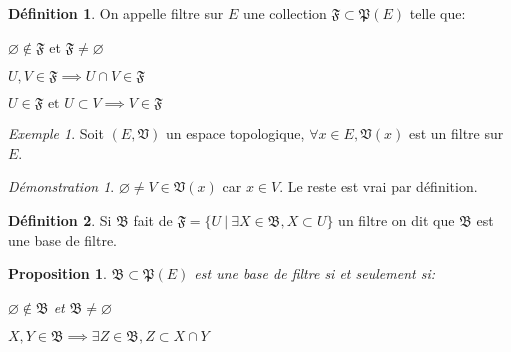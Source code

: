 \documentclass[a4paper, 11pt, french]{book}
\newenvironment{itemise}{\itemize}{\enditemize}
\theoremstyle{plain} %
\newtheorem{proposition}{Proposition}
\theoremstyle{definition} %
\newtheorem{definition}{Définition}
\theoremstyle{remark} %
\newtheorem{exemple}{Exemple}
\newtheorem*{demonstration}{Démonstration}
\newcommand{\1}{\mathds{1}}
\newcommand\vide{\varnothing}
\newcommand\et{\text{ et }}
\newcommand\ens[2]{\{#1 \ |\ #2\}}
\begin{document}
\begin{definition}
	On appelle filtre sur $E$ une collection $\mathfrak{F}\subset\mathfrak{P}(E)$ telle que:
	\begin{itemise}
		\item $\vide\notin\mathfrak{F}$ et $\mathfrak{F}\neq\vide$
		\item $U, V\in\mathfrak{F}\implies U\cap V\in\mathfrak{F}$
		\item $U\in\mathfrak{F}\et U\subset V\implies V\in\mathfrak{F}$
	\end{itemise}
\end{definition}

\begin{exemple}
	Soit $(E, \mathfrak{V})$ un espace topologique, $\forall x\in E, \mathfrak{V}(x)$ est un filtre sur $E$.
\end{exemple}

\begin{demonstration}
	$\vide\neq V\in\mathfrak{V}(x)$ car $x\in V$.
	Le reste est vrai par définition.
\end{demonstration}

\begin{definition}
	Si $\mathfrak{B}$ fait de $\mathfrak{F}=\ens{U}{\exists X\in\mathfrak{B}, X\subset U}$ un filtre on dit que $\mathfrak{B}$ est une base de filtre.
\end{definition}

\begin{proposition}
	$\mathfrak{B}\subset\mathfrak{P}(E)$ est une base de filtre si et seulement si:
	\begin{itemise}
		\item $\vide\notin\mathfrak{B}$ et $\mathfrak{B}\neq\vide$
		\item $X, Y\in\mathfrak{B}\implies\exists Z\in\mathfrak{B}, Z\subset X\cap Y$
	\end{itemise}
\end{proposition}
\end{document}

